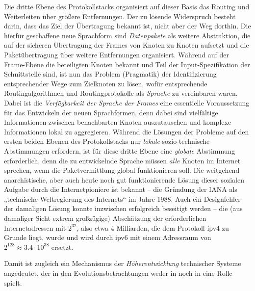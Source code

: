 \documentclass[12pt,a4paper]{article}
\begin{document}
Die dritte Ebene des Protokollstacks organisiert auf dieser Basis das Routing
und Weiterleiten über größere Entfernungen.  Der zu lösende Widerspruch
besteht darin, dass das Ziel der Übertragung bekannt ist, nicht aber der Weg
dorthin.  Die hierfür geschaffene neue Sprachform sind \emph{Datenpakete} als
weitere Abstraktion, die auf der sicheren Übertragung der Frames von Knoten zu
Knoten aufsetzt und die Paketübertragung über weitere Entfernungen
organisiert.  Während auf der Frame-Ebene die beteiligten Knoten bekannt und
Teil der Input-Spezifikation der Schnittstelle sind, ist nun das Problem
(Pragmatik) der Identifizierung entsprechender Wege zum Zielknoten zu lösen,
wofür entsprechende Routingalgorithmen und Routingprotokolle als
\emph{Sprache} zu vereinbaren waren.  Dabei ist die \emph{Verfügbarkeit der
  Sprache der Frames} eine essentielle Voraussetzung für das Entwickeln der
neuen Sprachformen, denn dabei sind vielfältige Informationen zwischen
benachbarten Knoten auszutauschen und komplexe Informationen lokal zu
aggregieren.  Während die Lösungen der Probleme auf den ersten beiden Ebenen
des Protokollstacks nur \emph{lokale} sozio-technische Abstimmungen erfordern,
ist für diese dritte Ebene eine \emph{globale} Abstimmung erforderlich, denn
die zu entwickelnde Sprache müssen \emph{alle} Knoten im Internet sprechen,
wenn die Paketvermittlung global funktionieren soll. Die weitgehend
anarchistische, aber auch heute noch gut funktionierende Lösung dieser
sozialen Aufgabe durch die Internetpioniere ist bekannt -- die Gründung der
IANA als „technische Weltregierung des Internets“ im Jahre 1988.  Auch ein
Designfehler der damaligen Lösung konnte inzwischen erfolgreich beseitigt
werden -- die (aus damaliger Sicht extrem großzügige) Abschätzung der
erforderlichen Internetadressen mit $2^{32}$, also etwa 4 Milliarden, die dem
Protokoll ipv4 zu Grunde liegt, wurde und wird durch ipv6 mit einem Adressraum
von $2^{128}\approx 3.4\cdot 10^{38}$ ersetzt.

Damit ist zugleich ein Mechanismus der \emph{Höherentwicklung} technischer
Systeme angedeutet, der in den Evolutionsbetrachtungen weder in
\cite{TESE2018} noch in \cite{Shpakovsky2010} eine Rolle spielt.
\end{document}
